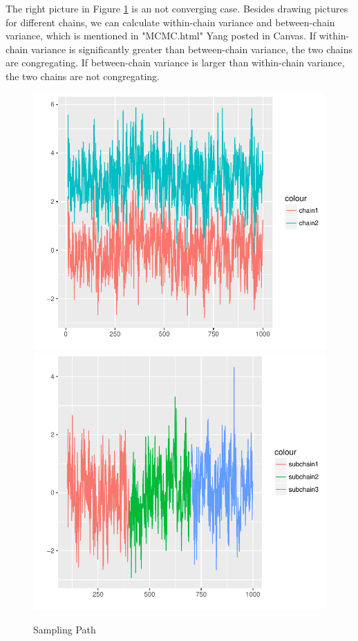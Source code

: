 \documentclass[twoside]{article}
\begin{document}
The right picture in Figure \ref{chain} is an not converging case. Besides drawing pictures for different chains, we can calculate within-chain variance and between-chain variance, which is mentioned in "MCMC.html" Yang posted in Canvas. If within-chain variance is significantly greater than between-chain variance, the two chains are congregating. If between-chain variance is larger than within-chain variance, the two chains are not congregating.
\begin{figure}
\includegraphics[scale=0.6]{Rplot1.pdf}
\includegraphics[scale=0.6]{Rplot2.pdf}
\caption{Sampling Path}
\label{chain}
\end{figure}
\end{document}
